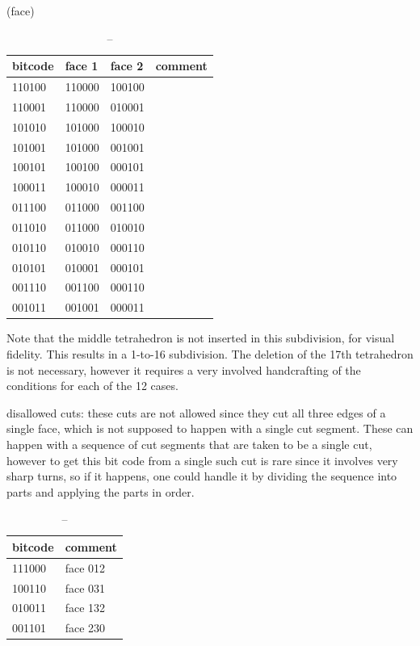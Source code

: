 (face)\\
\begin{table}[]
\begin{tabular}{|l|l|l|l|}
\hline
bitcode & face 1 & face 2 & comment \\ \hline
110100  & 110000 & 100100 &         \\ \hline
110001  & 110000 & 010001 &         \\ \hline
101010  & 101000 & 100010 &         \\ \hline
101001  & 101000 & 001001 &         \\ \hline
100101  & 100100 & 000101 &         \\ \hline
100011  & 100010 & 000011 &         \\ \hline
011100  & 011000 & 001100 &         \\ \hline
011010  & 011000 & 010010 &         \\ \hline
010110  & 010010 & 000110 &         \\ \hline
010101  & 010001 & 000101 &         \\ \hline
001110  & 001100 & 000110 &         \\ \hline
001011  & 001001 & 000011 &         \\ \hline
\end{tabular}
\caption{--}
\end{table}


Note that the middle tetrahedron is not inserted in this subdivision, for visual fidelity. This results in a 1-to-16 subdivision. The deletion of the 17th tetrahedron is not necessary, however it requires a very involved handcrafting of the conditions for each of the 12 cases.


disallowed cuts: these cuts are not allowed since they cut all three edges of a single face, which is not supposed to happen with a single cut segment. These can happen with a sequence of cut segments that are taken to be a single cut, however to get this bit code from a single such cut is rare since it involves very sharp turns, so if it happens, one could handle it by dividing the sequence into parts and applying the parts in order.


\begin{table}[]
\begin{tabular}{|l|l|}
\hline
bitcode & comment  \\ \hline
111000  & face 012 \\ \hline
100110  & face 031 \\ \hline
010011  & face 132 \\ \hline
001101  & face 230 \\ \hline
\end{tabular}
\caption{--}
\end{table}



